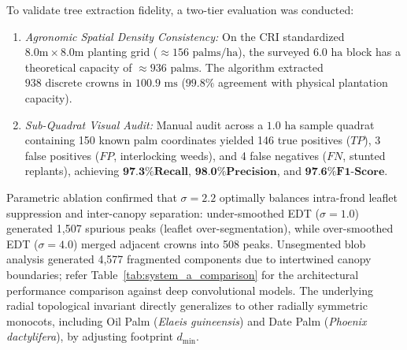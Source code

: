 \documentclass[conference,a4paper]{IEEEtran}
\begin{document}
\begin{table}[htbp]
\caption{Architectural Comparison for Tree Detection}
\vspace{-2.5mm}
\centering
{}
\label{tab:system_a_comparison}
\vspace{-2.5mm}
\end{table}

To validate tree extraction fidelity, a two-tier evaluation was conducted:
\begin{enumerate}[\IEEEsetlabelwidth{1)}]
    \setlength{\itemsep}{0pt}\setlength{\parskip}{0pt}
    \item \textit{Agronomic Spatial Density Consistency:} On the CRI standardized $8.0\text{m} \times 8.0\text{m}$ planting grid ($\approx 156\text{ palms/ha}$), the surveyed $6.0\text{ ha}$ block has a theoretical capacity of $\approx 936\text{ palms}$. The algorithm extracted $938\text{ discrete crowns}$ in $100.9\text{ ms}$ ($99.8\%$ agreement with physical plantation capacity).
    \item \textit{Sub-Quadrat Visual Audit:} Manual audit across a $1.0\text{ ha}$ sample quadrat containing 150 known palm coordinates yielded 146 true positives ($TP$), 3 false positives ($FP$, interlocking weeds), and 4 false negatives ($FN$, stunted replants), achieving $\textbf{97.3\% Recall}$, $\textbf{98.0\% Precision}$, and $\textbf{97.6\% F1-Score}$.
\end{enumerate}

Parametric ablation confirmed that $\sigma=2.2$ optimally balances intra-frond leaflet suppression and inter-canopy separation: under-smoothed EDT ($\sigma=1.0$) generated 1,507 spurious peaks (leaflet over-segmentation), while over-smoothed EDT ($\sigma=4.0$) merged adjacent crowns into 508 peaks. Unsegmented blob analysis generated 4,577 fragmented components due to intertwined canopy boundaries; refer Table~\ref{tab:system_a_comparison} for the architectural performance comparison against deep convolutional models. The underlying radial topological invariant directly generalizes to other radially symmetric monocots, including Oil Palm (\textit{Elaeis guineensis}) and Date Palm (\textit{Phoenix dactylifera}), by adjusting footprint $d_{\min}$.
\end{document}
